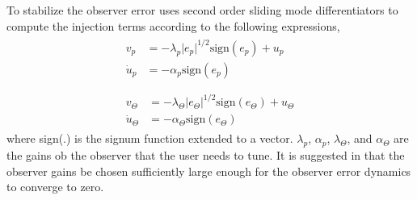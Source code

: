\documentclass[letterpaper%
, twoside%
, 12pt%
,memoire%
, english%
,creativecommons,hyperref%
]{thETS}
\begin{document}
To stabilize the observer error \citep{bash2019analysis} uses second order sliding mode differentiators to compute the injection terms \citep{levant1998robust} according to the following expressions, 
\begin{subequations}
\label{sto}
\begin{align}
\begin{split}\label{eqn:STO5}
v_p&=-\lambda_p \vert e_p \vert ^{1/2}\text{sign}(e_p)+u_p \\
\dot{u}_p&=-\alpha_p \text{sign}(e_p)
\end{split}\\ \nonumber\\
\begin{split}\label{eqn:STO6} 
v_\Theta&=-\lambda_\Theta \vert e_\Theta \vert ^{1/2}\text{sign}(e_\Theta)+u_\Theta \\
\dot{u}_\Theta&=-\alpha_\Theta \text{sign}(e_\Theta)
\end{split}
\end{align}
\end{subequations}
where sign(.) is the signum function extended to a vector. $\lambda_p$, $\alpha_p$, $\lambda_\Theta$, and $\alpha_\Theta$ are the gains ob the observer that the user needs to tune. It is suggested in \citep{levant1998robust} that the observer gains be chosen sufficiently large enough for the observer error dynamics to converge to zero. 
\end{document}
